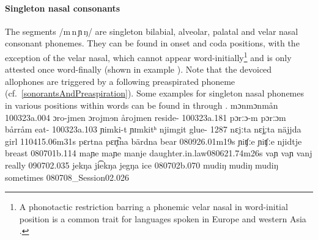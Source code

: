 \FB

\paragraph{Singleton nasal consonants}
The segments /m\,n\,ɲ\,ŋ/ are singleton bilabial, alveolar, palatal and velar nasal consonant phonemes. 
They can be found in onset and coda positions, with the exception of the velar nasal, which cannot appear word-initially\footnote{A phonotactic restriction barring a phonemic velar nasal in word-initial position is a common trait for languages spoken in Europe and western Asia \citep[cf.][]{Anderson2008a}.} 
and is only attested once word-finally (shown in example ). 
Note that the devoiced allophones are triggered by a following preaspirated phoneme (cf.~\SEC\ref{sonorantsAndPreaspiration}).
Some examples for singleton nasal phonemes in various positions within words can be found in  through .  
			{{m}ɔ{n}}{{m}ɔ{n}}{mån}	{}			{100323a}{.004}
		{ɔro-j{m}en}	{ɔroj{m}ɘn}	{årojmen}	{reside-}		{100323a}{.181}
				{pɔrːɔ-{m}}	{pɔrːɔ{m}}	{bårråm}	{eat-}			{100323a}{.103}
				{ɲi{m}ki-t}		{ɲɪ{m}kitʰ}	{njimgit}	{glue-}			{1287}
			{{n}ɛjːta}		{{n}ɛj̥ːta}		{näjjda}	{girl\BS{}}		{110415}{.06m31s}
			{pɛrt{n}a}		{pɛr̥t̚{n}a}		{bärdna}	{bear\BS{}}		{080926}{.01m19s}
		{{ɲ}iʧːe}		{{ɲ}iʧːe}		{njidtje}	{breast\BS{}}	{080701b}{.114}
	{ma{ɲ}e}		{ma{ɲ}e}		{manje}	{daughter.in.law\BS{}}{080621}{.74m26s}
				{va{ɲ}}		{va{ɲ}}		{vanj}	{really}					{090702}{.035}
			{jek{ŋ}a}		{ji͡ek{ŋ}a}		{jegŋa}	{ice\BS{}}		{080702b}{.070}
	{mudi{ŋ}}		{mudi{ŋ}}		{mudiŋ}	{sometimes}			{080708\_Session02}{.026}%

